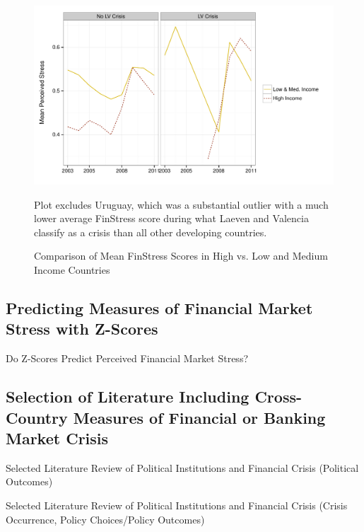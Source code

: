 \documentclass[]{article}
\begin{document}
\begin{figure}
    \caption{Comparison of Mean FinStress Scores in High vs. Low and Medium Income Countries}
    \label{comp_dev_developing}

    \begin{center}
        \includegraphics[scale=0.55]{figures/dev_vs_devoloping.pdf}
    \end{center}
    {\scriptsize{Plot excludes Uruguay, which was a substantial outlier with a much lower average FinStress score during what Laeven and Valencia classify as a crisis than all other developing countries.}}
\end{figure}

\subsection*{Predicting Measures of Financial Market Stress with Z-Scores}

\begin{table}[H]
    \caption{Do Z-Scores Predict Perceived Financial Market Stress?}
    \label{epfms_z_regress}

    \begin{center}
    {\tiny{
        
    }}
    \end{center}
\end{table}

\subsection*{Selection of Literature Including Cross-Country Measures of Financial or Banking Market Crisis}

\begin{table}[H]
\caption{Selected Literature Review of Political Institutions and Financial
Crisis (Political Outcomes)}


\label{LitRevTable2}
\begin{center}

\vspace{0.5cm}
{\tiny{

}}
\end{center}
\end{table}

\begin{table}[H]
\caption{Selected Literature Review of Political Institutions and Financial
Crisis (Crisis Occurrence, Policy Choices/Policy Outcomes)}


\label{LitRevTable}
\begin{center}

\vspace{0.5cm}
{\tiny{

}}
\end{center}
\end{table}
\end{document}

